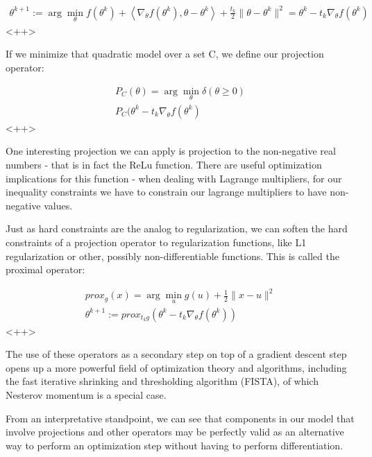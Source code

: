\documentclass[a4paper]{article}
\begin{document}
\begin{equation}
  \begin{split}
    \theta^{k+1} := \arg \min_{\theta} f(\theta^k) + \left< \nabla_{\theta} f(\theta^k), \theta-\theta^k \right> + \frac{t_k}{2} \lVert \theta - \theta^k \rVert^2
    = \theta^k - t_k \nabla_{\theta} f(\theta^k)
  \end{split}
  \label{<++>}
\end{equation}<++>

If we minimize that quadratic model over a set C, we define our projection operator:

\begin{equation}
  \begin{split}
    P_C(\theta) = \arg \min_{\theta} \delta \left( \theta \ge 0 \right) \\
    P_C(\theta^k - t_k \nabla_{\theta} f(\theta^k)
  \end{split}
  \label{<++>}
\end{equation}<++>

One interesting projection we can apply is projection to the non-negative real numbers - that is in fact the ReLu function. 
There are useful optimization implications for this function - when dealing with Lagrange multipliers, for our inequality constraints we have to constrain our lagrange multipliers to have non-negative values. 

Just as hard constraints are the analog to regularization, we can soften the hard constraints of a projection operator to regularization functions, like L1 regularization or other, possibly non-differentiable functions. 
This is called the proximal operator:

\begin{equation}
  \begin{split}
    prox_g(x) = \arg \min_{u} g(u) + \frac{1}{2} \lVert x - u \rVert ^2\\
    \theta^{k+1} := prox_{t_k g} \left( \theta^k - t_k \nabla_{\theta} f(\theta^k) \right)
  \end{split}
  \label{<++>}
\end{equation}<++>

The use of these operators as a secondary step on top of a gradient descent step opens up a more powerful field of optimization theory and algorithms, including the fast iterative shrinking and thresholding algorithm (FISTA), of which Nesterov momentum is a special case. 

From an interpretative standpoint, we can see that components in our model that involve projections and other operators may be perfectly valid as an alternative way to perform an optimization step without having to perform differentiation. 
\end{document}
